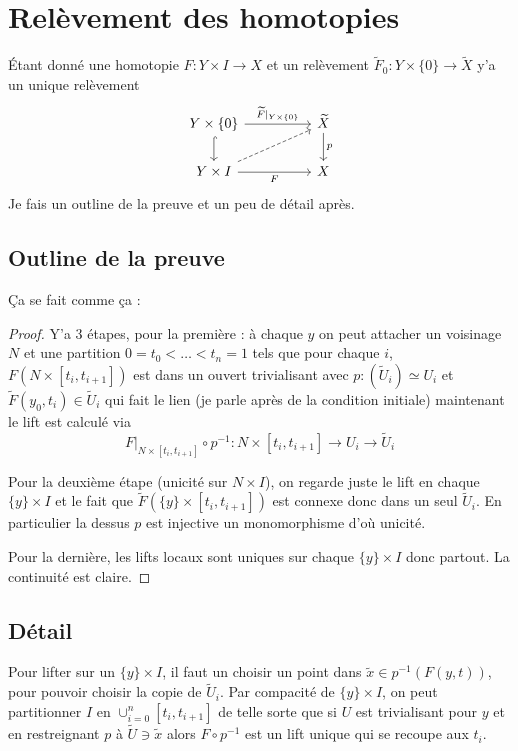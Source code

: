 \documentclass[a4paper,12pt]{article}
\theoremstyle{plain}
\theoremstyle{definition}
\theoremstyle{remark}
\begin{document}
\section{Relèvement des homotopies}
Étant donné une homotopie $F\colon Y\times I\to X$ et
un relèvement $\widetilde F_0\colon Y\times\{0\}\to \widetilde X$
y'a un unique relèvement 
\[\begin{tikzcd}
	{Y\times \{0\}} && {\widetilde X} \\
	{Y\times I} && X
	\arrow["{\widetilde F|_{Y\times\{0\}}}", from=1-1, to=1-3]
	\arrow[hook, from=1-1, to=2-1]
	\arrow["p", from=1-3, to=2-3]
	\arrow[dashed, from=2-1, to=1-3]
	\arrow["F"', from=2-1, to=2-3]
\end{tikzcd}\]
Je fais un outline de la preuve et un peu de détail
après.
\subsection{Outline de la preuve}
Ça se fait comme ça :
\begin{proof}
  Y'a $3$ étapes, pour la première : à chaque $y$ on peut
  attacher un voisinage $N$ et une partition
  $0=t_0< \ldots< t_n=1$ tels que pour 
  chaque $i$, $F(N\times [t_i,t_{i+1}])$ est dans
  un ouvert trivialisant avec 
  $p\colon (\tilde U_i)\simeq U_i$
  et $\tilde F(y_0,t_i)\in \tilde U_i$ qui fait le
  lien (je parle après de la condition initiale)
  maintenant le lift est calculé via 
  \[F|_{N\times [t_i,t_{i+1}]}\circ p^{-1}\colon N\times [t_i,t_{i+1}]\to U_i\to \tilde U_i\]
  
  Pour la deuxième étape (unicité sur $N\times I$), on
  regarde juste le lift en chaque $\{y\}\times I$ et le
  fait que $\tilde F(\{y\}\times [t_i,t_{i+1}])$ 
  est connexe donc dans un seul $\tilde U_i$. En 
  particulier la dessus $p$ est injective un 
  monomorphisme d'où unicité.

  Pour la dernière, les lifts locaux sont uniques sur
  chaque $\{y\}\times I$ donc partout. La continuité
  est claire.
\end{proof}
\subsection{Détail}
Pour lifter sur un $\{y\}\times I$, il faut un choisir
un point dans $\tilde x \in p^{-1}(F(y,t))$, pour
pouvoir choisir la copie de $\tilde U_i$.
Par compacité de $\{y\}\times I$, on peut
partitionner $I$ en $\cup_{i=0}^n [t_i,t_{i+1}]$ de 
telle sorte que si $U$ est trivialisant pour $y$ et
en restreignant $p$ à $\tilde U\ni \tilde x$ alors 
$F\circ p^{-1}$ est un lift unique qui se recoupe aux
$t_i$.
\end{document}
